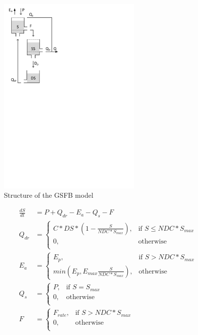 { 																	%
\begin{figure}
\includegraphics[trim=1cm 17cm 7cm 1cm,width=7cm,keepaspectratio]{./files/20_schematic.pdf}
\caption{Structure of the GSFB model} \label{fig:20_schematic}
\end{figure}

\begin{align}
	\frac{dS}{dt} &= P + Q_{dr}- E_a -Q_s-F \\
	Q_{dr} &= \begin{cases}
		C*DS*\left(1-\frac{S}{NDC*S_{max}}\right), &\text{if } S \leq NDC*S_{max} \\
		0, & \text{otherwise} \\
	\end{cases} \\
	E_a &= 
	\begin{cases}
		E_p, & \text{if } S > NDC*S_{max} \\
		min\left(E_p, E_{max}\frac{S}{NDC*S_{max}}\right), & \text{otherwise}
	\end{cases} \\
	Q_s &= \begin{cases}
		P, &\text{if } S = S_{max} \\
		0, & \text{otherwise} \\
	\end{cases} \\
	F &= \begin{cases}
		F_{rate}, &\text{if } S > NDC*S_{max} \\
		0, & \text{otherwise} \\
	\end{cases} 
\end{align}

} %
\vspace{1cm}


